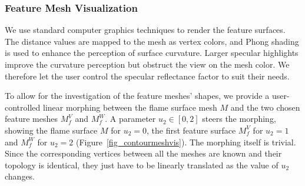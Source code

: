 \subsubsection{Feature Mesh Visualization}
%
We use standard computer graphics techniques to render the feature surfaces. The
distance values are mapped to the mesh as vertex colors, and Phong shading is
used to enhance the perception of surface curvature. Larger specular highlights
improve the curvature perception but obstruct the view on the mesh color. We
therefore let the user control the specular reflectance factor to suit their
needs.
%

To allow for the investigation of the feature meshes' shapes, we provide a 
user-controlled linear morphing between the flame surface mesh $M$ and the two
chosen feature meshes $M^{V}_{f}$ and $M^{W}_{f}$. A parameter $u_2 \in [0, 2]$
steers the morphing, showing the flame surface $M$ for $u_2 = 0$, the first
feature surface $M^{V}_{f}$ for $u_2 = 1$ and $M^{W}_{f}$ for $u_2 = 2$
(Figure~\ref{fig_contourmeshvis}). The morphing itself is trivial. Since the
corresponding vertices between all the meshes are known and their topology is
identical, they just have to be linearly translated as the value of $u_2$ changes.

